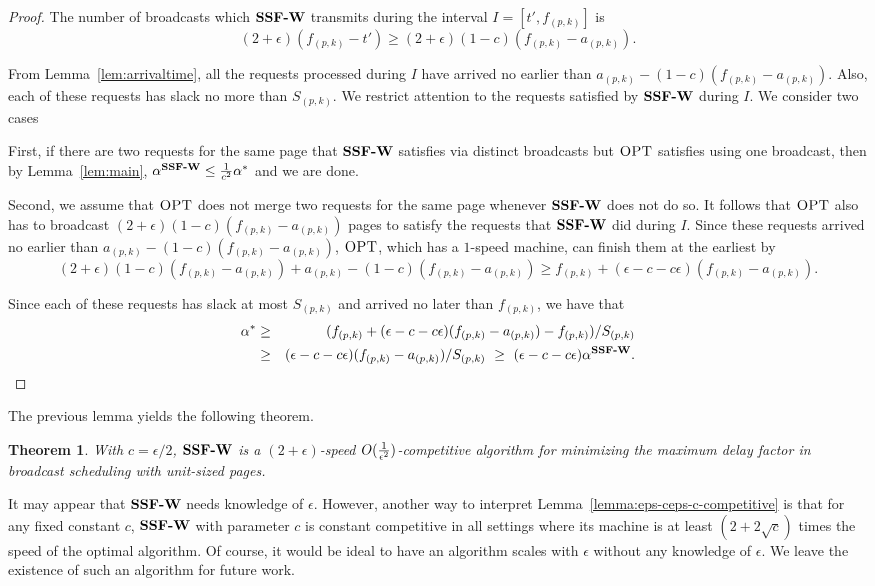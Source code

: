 \documentclass[11pt]{article}
\newtheorem{theorem}[lemma]{Theorem}
\newcommand{\lemref}[1]{Lemma~\ref{lemma:#1}}
\newcommand{\opt}{\textrm{\sc OPT}}
\newcommand{\eps}{\epsilon}
\newcommand{\st}{S} \newcommand{\Algorithm}[1]{{\texttt{\bf{#1}}}} \newcommand{\sbg}{\Algorithm{SSF-W}} \newcommand{\sug}{\Algorithm{SSF}} \newcommand{\mmug}{\Algorithm{SSF-ID}}
\begin{document}
\begin{proof}
The number of broadcasts which $\sbg$ transmits during the
interval $I = [t', f_{(p,k)}]$ is
\[
(2 + \epsilon)(f_{(p,k)} - t') \ge (2+\eps)(1-c)(f_{(p,k)} - a_{(p,k)}).
\]

From Lemma~\ref{lem:arrivaltime}, all the requests processed during
$I$ have arrived no earlier than $a_{(p,k)} - (1-c)(f_{(p,k)} -
a_{(p,k)})$. Also, each of these requests has slack no more than
$\st_{(p,k)}$. We restrict attention to the requests satisfied by $\sbg$
during $I$. We consider two cases

First, if there are two requests for the same page that $\sbg$ satisfies
via distinct broadcasts but $\opt$ satisfies using one broadcast, then
by Lemma~\ref{lem:main}, $\alpha^{\sbg} \le \frac{1}{c^2}\alpha^*$ and we
are done.

Second, we assume that $\opt$ does not merge two requests for the same
page whenever $\sbg$ does not do so. It follows that $\opt$ also has
to broadcast $(2+\eps)(1-c)(f_{(p,k)} - a_{(p,k)})$ pages to satisfy
the requests that $\sbg$ did during $I$. Since these
requests arrived no earlier than $a_{(p,k)} - (1-c)(f_{(p,k)} - a_{(p,k)})$,
$\opt$, which has a $1$-speed machine, can finish them at the earliest
by
\[
(2+\eps)(1-c)(f_{(p,k)} - a_{(p,k)}) + a_{(p,k)} - (1-c)(f_{(p,k)} - a_{(p,k)}) \ge f_{(p,k)} + (\eps - c - c\eps)(f_{(p,k)} - a_{(p,k)}).
\]

Since each of these requests has slack at most $\st_{(p,k)}$ and arrived
no later than $f_{(p,k)}$, we have that
\begin{eqnarray*}
  \alpha^* & \ge & (f_{(p,k)} + (\eps - c - c\eps)(f_{(p,k)} - a_{(p,k)}) - f_{(p,k)})/\st_{(p,k)} \\
  & \ge & (\eps - c - c\eps)(f_{(p,k)} - a_{(p,k)})/\st_{(p,k)}
  ~ \ge ~  (\eps - c - c\eps)\alpha^{\sbg}.
\end{eqnarray*}
\end{proof}

The previous lemma yields the following theorem.

\begin{theorem}
  With $c = \eps/2$, $\sbg$ is a $(2+ \eps)$-speed $O({1 \over
    {\eps^2}})$-competitive algorithm for minimizing the maximum delay
  factor in broadcast scheduling with unit-sized pages.
\end{theorem}

It may appear that $\sbg$ needs knowledge of $\eps$. However, another
way to interpret \lemref{eps-ceps-c-competitive} is that for any fixed
constant $c$, $\sbg$ with parameter $c$ is constant competitive in all
settings where its machine is at least $(2+2\sqrt{c})$ times the speed
of the optimal algorithm. Of course, it would be ideal to have an
algorithm scales with $\eps$ without any knowledge of $\eps$. We leave
the existence of such an algorithm for future work.
\end{document}
